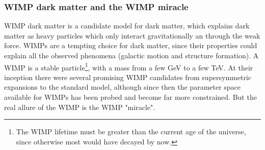 \subsubsection{WIMP dark matter and the WIMP miracle}\label{sec:IntroWIMPs}
WIMP dark matter is a candidate model for dark matter, which explains dark matter as heavy particles which only interact gravitationally an through the weak force. WIMPs are a tempting choice for dark matter, since their properties could explain all the observed phenomena (galactic motion and structure formation). A WIMP is a stable particle\footnote{The WIMP lifetime must be greater than the current age of the universe, since otherwise most would have decayed by now.}, with a mass from a few GeV to a few TeV. At their inception there were several promising WIMP candidates from supersymmetric expansions to the standard model, although since then the parameter space available for WIMPs has been probed and become far more constrained. But the real allure of the WIMP is the WIMP "miracle". \\

